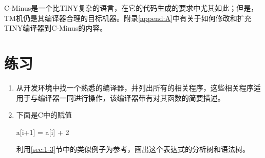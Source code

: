 \documentclass[lang=cn,10pt]{elegantbook}
\begin{document}
C-Minus是一个比TINY复杂的语言，在它的代码生成的要求中尤其如此；但是，TM机仍是其编译器合理的目标机器。附录\ref{append:A}中有关于如何修改和扩充TINY编译器到C-Minus的内容。

\section{练习}
\label{sec:1-9}

\begin{enumerate}
  \item 从开发环境中找一个熟悉的编译器，并列出所有的相关程序，这些相关程序适用于与编译器一同进行操作，该编译器带有对其函数的简要描述。
  \item 下面是C中的赋值
  
  a[i+1] = a[i] + 2

  利用\ref{sec:1-3}节中的类似例子为参考，画出这个表达式的分析树和语法树。


\end{enumerate}
\end{document}
